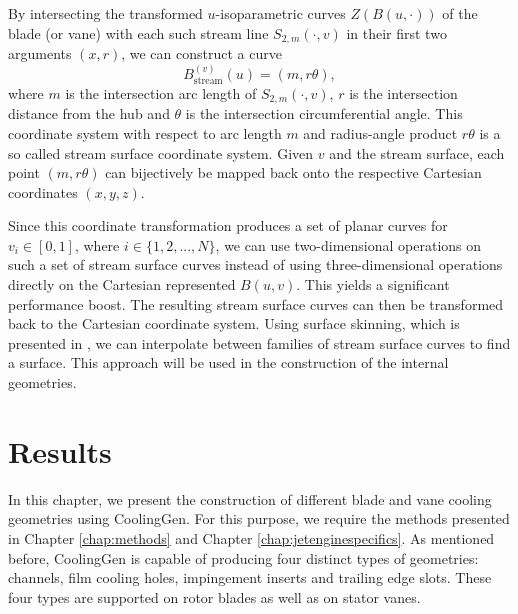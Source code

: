 \documentclass[a4paper, 11pt]{report}
\theoremstyle{definition}
\begin{document}
	By intersecting the transformed $u$-isoparametric curves $Z(B(u,\cdot))$ of the blade (or vane) with each such stream line $S_{2,m}(\cdot, v)$ in their first two arguments $(x,r)$, we can construct a curve
		$$ B^{(v)}_\textrm{stream}(u) = (m, r\theta),$$
	where $m$ is the intersection arc length of $S_{2,m}(\cdot, v)$, $r$ is the intersection distance from the hub and $\theta$ is the intersection circumferential angle. This coordinate system with respect to arc length $m$ and radius-angle product $r\theta$ is a so called stream surface coordinate system. Given $v$ and the stream surface, each point $(m, r\theta)$ can bijectively be mapped back onto the respective Cartesian coordinates $(x, y, z)$.

	Since this coordinate transformation produces a set of planar curves for $v_i \in [0,1]$, where $i \in \{1, 2, ..., N\}$, we can use two-dimensional operations on such a set of stream surface curves instead of using three-dimensional operations directly on the Cartesian represented $B(u,v)$. This yields a significant performance boost. The resulting stream surface curves can then be transformed back to the Cartesian coordinate system. Using surface skinning, which is presented in \cite{Piegl1997}, we can interpolate between families of stream surface curves to find a surface. This approach will be used in the construction of the internal geometries.

\chapter{Results}\label{chap:results}
	In this chapter, we present the construction of different blade and vane cooling geometries using CoolingGen. For this purpose, we require the methods presented in Chapter \ref{chap:methods} and Chapter \ref{chap:jetenginespecifics}. As mentioned before, CoolingGen is capable of producing four distinct types of geometries: channels, film cooling holes, impingement inserts and trailing edge slots. These four types are supported on rotor blades as well as on stator vanes.
 	
\end{document}
